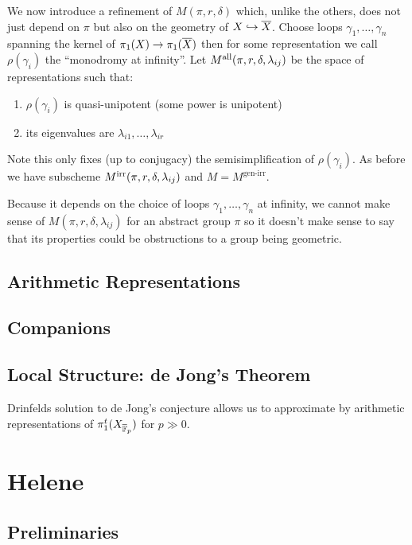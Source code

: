 \documentclass[12pt]{article}
\begin{document}
We now introduce a refinement of $M(\pi, r, \delta)$ which, unlike the others, does not just depend on $\pi$ but also on the geometry of $X \hookrightarrow \overline{X}$.  Choose loops $\gamma_1, \dots, \gamma_n$ spanning the kernel of $\pi_1(X) \to \pi_1(\overline{X})$ then for some representation we call $\rho(\gamma_i)$ the ``monodromy at infinity''. Let $M^{\mathrm{all}}(\pi, r, \delta, \lambda_{ij})$ be the space of representations such that:
\begin{enumerate}
\item $\rho(\gamma_i)$ is quasi-unipotent (some power is unipotent)
\item its eigenvalues are $\lambda_{i1}, \dots, \lambda_{ir}$
\end{enumerate}
Note this only fixes (up to conjugacy) the semisimplification of $\rho(\gamma_i)$. As before we have subscheme $M^{\mathrm{irr}}(\pi, r, \delta, \lambda_{ij})$ and $M = M^{\text{gen-irr}}$. 

\begin{rmk}
Because it depends on the choice of loops $\gamma_1, \dots, \gamma_n$ at infinity, we cannot make sense of $M(\pi, r, \delta, \lambda_{ij})$ for an abstract group $\pi$ so it doesn't make sense to say that its properties could be obstructions to a group being geometric. 
\end{rmk}

\subsection{Arithmetic Representations}

\subsection{Companions}

\subsection{Local Structure: de Jong's Theorem}

Drinfelds solution to de Jong's conjecture allows us to approximate by arithmetic representations of $\pi_1^t(X_{\overline{\mathbb{F}}_p})$ for $p \gg 0$. 

\section{Helene}

\subsection{Preliminaries}
\end{document}
